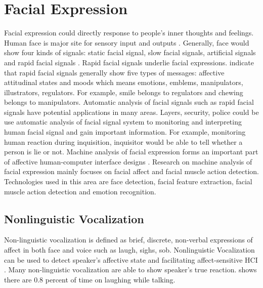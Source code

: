 \section{Facial Expression}
Facial expression could directly response to people's inner thoughts and feelings. Human face is major site for sensory input and outputs \cite{pantic2007machine}. Generally, face would show four kinds of signals: static facial signal, slow facial signals, artificial signals and rapid facial signals \cite{pantic2007machine}. Rapid facial signals underlie facial expressions. \cite{pantic2007machine} indicate that rapid facial signals generally show five types of messages: affective attitudinal states and moods which means emotions, emblems, manipulators, illustrators, regulators. For example, smile belongs to regulators and chewing belongs to manipulators. Automatic analysis of facial signals such as rapid facial signals have potential applications in many areas. Layers, security, police could be use automatic analysis of facial signal system to monitoring and interpreting human facial signal and gain important information. For example, monitoring human reaction during inquisition, inquisitor would be able to tell whether a person is lie or not.  Machine analysis of facial expression forms an important part of affective human-computer interface designs \cite{pantic2007machine}.  Research on machine analysis of facial expression mainly focuses on facial affect and facial muscle action detection\cite{pantic2007machine}. Technologies used in this area are face detection, facial feature extraction, facial muscle action detection and emotion recognition\cite{pantic2007machine}.
\subsection{Nonlinguistic Vocalization}
Non-linguistic vocalization is defined as brief, discrete, non-verbal expressions of affect in both face and voice \cite{petridis2011audiovisual} such as laugh, sighs, sob. Nonlinguistic Vocalization can be used to detect speaker's affective state and facilitating affect-sensitive HCI \cite{petridis2011audiovisual}. Many non-linguistic vocalization are able to show speaker's true reaction. \cite{petridis2011audiovisual} shows there are $0.8$ percent of time on laughing while talking.
